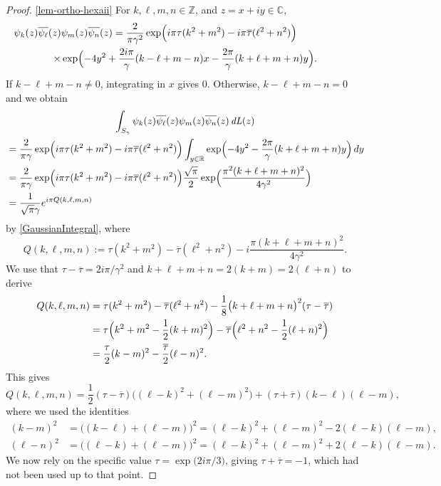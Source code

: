 \documentclass[10pt]{amsart}
\DeclareMathOperator{\dL}{\mathit{dL}}
\theoremstyle{definition}
\let\EE\exp
\let\ov\overline
\newcommand\C{\mathbb C}
\newcommand\R{\mathbb R}
\newcommand\Z{\mathbb Z}
\newcommand{\pa}[1]{\left(#1\right)}
\begin{document}
\begin{proof}
\eqref{lem-ortho-hexaii} For $k,\ell,m,n \in \Z$, and $z=x+iy \in \C$,
\begin{multline*}
\psi_{k}(z)\ov{\psi_{\ell}}(z)\psi_{m}(z)\ov{\psi_{n}}(z)=\frac{2}{\pi \gamma^2} \EE\Bigl({i\pi\tau (k^2+m^2)-i\pi\overline{\tau}(\ell^2+n^2)}\Bigr) \qquad \qquad \qquad \\
\times \EE\Bigl({-4y^2+\frac{2i\pi}{\gamma}(k-\ell+m-n)x-\frac{2\pi}{\gamma}(k+\ell+m+n)y}\Bigr).
\end{multline*}
If $k-\ell+m-n \neq 0$, integrating in $x$ gives $0$. Otherwise, $k-\ell+m-n = 0$ and we obtain
\begin{multline*}
\int_{S_{\gamma}} \psi_{k}(z)\ov{\psi_{\ell}}(z) \psi_{m}(z)\ov{\psi_{n}}(z) \dL(z)\\
\begin{aligned}
&=\frac{2}{\pi \gamma} \EE\Bigl(i\pi\tau (k^2+m^2)-i\pi\overline{\tau}(\ell^2+n^2) \Bigr) \int_{y\in\R} \EE\Bigl(-4y^2-\frac{2\pi}{\gamma}(k+\ell+m+n)y \Bigr)\,dy \\
&= \frac{2}{\pi \gamma} \EE\Bigl({i\pi\tau (k^2+m^2)-i\pi\overline{\tau}(\ell^2+n^2)} \Bigr) \frac{\sqrt{\pi}}{2} \EE\Bigl({\frac{\pi^2(k+\ell+m+n)^2}{4\gamma^2}} \Bigr) \\
&= \frac{1}{\sqrt{\pi}\gamma}e^{i\pi Q(k,\ell,m,n)}
\end{aligned}
\end{multline*}
by \eqref{GaussianIntegral}, where
\[
Q(k,\ell,m,n):= \tau (k^2+m^2) - \overline{\tau}(\ell^2+n^2) -i \dfrac{\pi(k+\ell+m+n)^2}{4\gamma^2}.
\]
We use that $\tau - \ov{\tau} = 2i {\pi}/{\gamma^2}$ and $k+\ell+m+n = 2(k+m) = 2(\ell+n)$ to derive
\begin{align*}
Q(k,\ell,m,n) &= \tau (k^2+m^2) - \overline{\tau}(\ell^2+n^2) - \frac{1}{8}\bigl(k+\ell+m+n\bigr)^2(\tau-\ov{\tau})\\
&= \tau\Bigl({k^2+m^2-\frac12(k+m)^2}\Bigr) - \ov{\tau}\Bigl({\ell^2+n^2-\frac12(\ell+n)^2} \Bigr)\\
&= \frac{\tau}{2}(k-m)^2 - \frac{\ov{\tau}}{2}(\ell-n)^2.
\end{align*}
This gives
\begin{equation}\label{proj_4psi_general}
Q(k,\ell,m,n) = \frac{1}{2}(\tau-\ov{\tau})\bigl({(\ell-k)^2 + (\ell-m)^2}\bigr) + \pa{\tau+\ov{\tau}}(k-\ell)(\ell-m),
\end{equation}
where we used the identities
\begin{align*}
(k-m)^2 &= \bigl((k-\ell)+(\ell-m)\bigr)^2 = (\ell-k)^2 + (\ell-m)^2 -2(\ell-k)(\ell-m), \\
(\ell-n)^2 &= \bigl((\ell-k)+(\ell-m)\bigr)^2 = (\ell-k)^2 + (\ell-m)^2 +2(\ell-k)(\ell-m).
\end{align*}
We now rely on the specific value $\tau = \EE\bigl({{2i\pi}/{3}}\bigr)$, giving $\tau + \ov{\tau} = -1$, which had not been used up to that point.


\end{proof}
\end{document}
